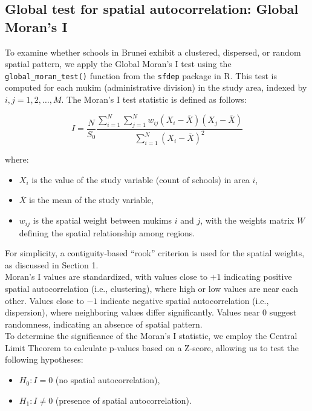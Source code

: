 \documentclass[12pt]{article}
\begin{document}
\subsection{Global test for spatial autocorrelation: Global Moran's I}
To examine whether schools in Brunei exhibit a clustered, dispersed, or random spatial pattern, we apply the Global Moran’s I test using the \texttt{global\_moran\_test()} function from the \texttt{sfdep} package in R. This test is computed for each mukim (administrative division) in the study area, indexed by \( i, j = 1, 2, \dots, M \). The Moran’s I test statistic is defined as follows: 

\begin{equation}
I = \frac{N}{S_0} \frac{\sum_{i=1}^N \sum_{j=1}^N w_{ij} (X_i - \bar{X})(X_j - \bar{X})}{\sum_{i=1}^N (X_i - \bar{X})^2}
\end{equation}

where:
\begin{itemize}
    \item \( X_i \) is the value of the study variable (count of schools) in area \( i \),
    \item \( \bar{X} \) is the mean of the study variable,
    \item \( w_{ij} \) is the spatial weight between mukims \( i \) and \( j \), with the weights matrix \( W \) defining the spatial relationship among regions.
\end{itemize}

For simplicity, a contiguity-based “rook” criterion is used for the spatial weights, as discussed in Section 1. %
\\

Moran’s I values are standardized, with values close to \(+1\) indicating positive spatial autocorrelation (i.e., clustering), where high or low values are near each other. Values close to \(-1\) indicate negative spatial autocorrelation (i.e., dispersion), where neighboring values differ significantly. Values near \(0\) suggest randomness, indicating an absence of spatial pattern. \\

To determine the significance of the Moran’s I statistic, we employ the Central Limit Theorem to calculate p-values based on a Z-score, allowing us to test the following hypotheses:
\begin{itemize}
    \item \( H_0: I = 0 \) (no spatial autocorrelation),
    \item \( H_1: I \neq 0 \) (presence of spatial autocorrelation).
\end{itemize}
\end{document}
